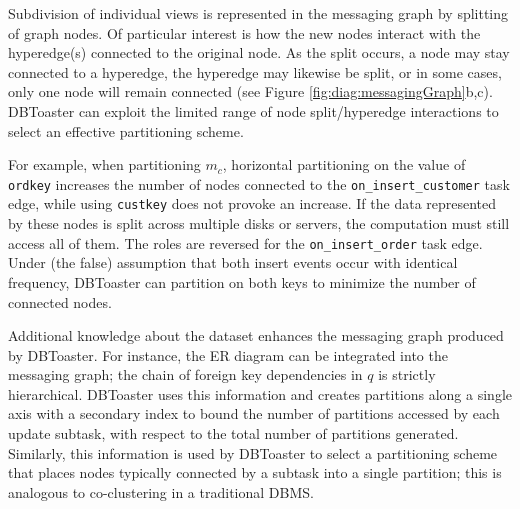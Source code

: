 {Subdivision of individual views is represented in the messaging graph by
splitting of graph nodes.  Of particular interest is how the new nodes interact
with the hyperedge(s) connected to the original node.  As the split occurs, a
node may stay connected to a hyperedge, the hyperedge may likewise be split, or
in some cases, only one node will remain connected (see Figure
\ref{fig:diag:messagingGraph}b,c).  DBToaster can exploit the limited range of
node split/hyperedge interactions to select an effective partitioning scheme.

For example, when partitioning $m_c$, horizontal partitioning on the value of
\texttt{ordkey} increases the number of nodes connected to the
\texttt{on\_insert\_customer} task edge, while using \texttt{custkey} does not
provoke an increase.  If the data represented by these nodes is split across
multiple disks or servers, the computation must still access all of them.  The
roles are reversed for the \texttt{on\_insert\_order} task edge.  Under (the
false) assumption that both insert events occur with identical frequency,
DBToaster can partition on both keys to minimize the number of connected nodes.

Additional knowledge about the dataset enhances the messaging graph produced by
DBToaster.  For instance, the ER diagram can be integrated into the messaging
graph; the chain of foreign key dependencies in $q$ is strictly hierarchical. 
DBToaster uses this information and creates partitions along a single axis with
a secondary index to bound the number of partitions accessed by each update
subtask, with respect to the total number of partitions generated.  Similarly,
this information is used by DBToaster to select a partitioning scheme that
places nodes typically connected by a subtask into a single partition; this is
analogous to co-clustering in a traditional DBMS.

} %
